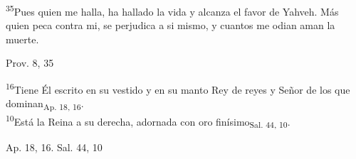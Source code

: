 \documentclass[a4paper,11pt]{article}
\begin{document}
      \textsuperscript{35}Pues quien me halla, ha hallado la vida y alcanza el favor de Yahveh. Más quien peca contra mi, se perjudica a si mismo,
      y cuantos me odian aman la muerte.
      \begin{flushright}
        Prov. 8, 35
      \end{flushright}

      \textsuperscript{16}Tiene Él escrito en su vestido y en su manto Rey de reyes y Señor de los que dominan\textsubscript{Ap. 18, 16}.  \\
      \textsuperscript{10}Está la Reina a su derecha, adornada con oro finísimo\textsubscript{Sal. 44, 10}.
      \begin{flushright}
        Ap. 18, 16. Sal. 44, 10
      \end{flushright}
\end{document}
